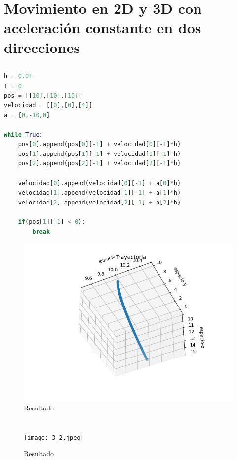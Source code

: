 \documentclass{article}
\begin{document}
\section{Movimiento en 2D y 3D con aceleración constante en dos direcciones}
\subsection{}
\begin{lstlisting}[language=Python,caption=Desafío 1.1]
h = 0.01
t = 0
pos = [[10],[10],[10]]
velocidad = [[0],[0],[4]]
a = [0,-10,0]

while True:
    pos[0].append(pos[0][-1] + velocidad[0][-1]*h)
    pos[1].append(pos[1][-1] + velocidad[1][-1]*h)
    pos[2].append(pos[2][-1] + velocidad[2][-1]*h)

    velocidad[0].append(velocidad[0][-1] + a[0]*h)
    velocidad[1].append(velocidad[1][-1] + a[1]*h)
    velocidad[2].append(velocidad[2][-1] + a[2]*h)

    if(pos[1][-1] < 0):
        break
\end{lstlisting}
\begin{figure}[H]
    \centering
    \includegraphics[width=1.21\textwidth]{3_1.png}
    \caption{Resultado}
\end{figure}
\section{}
\begin{figure}[H]
    \centering
    \texttt{[image: 3\_2.jpeg]}
    \caption{Resultado}
\end{figure}
\end{document}

